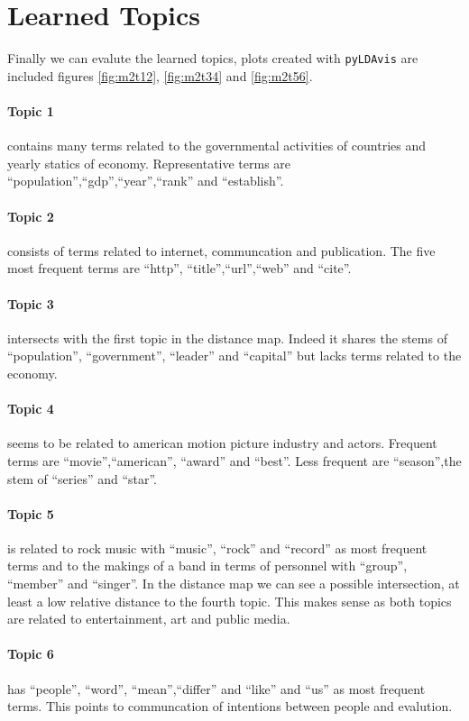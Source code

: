 \documentclass[12 pt,twopage]{article}
\begin{document}
\section{Learned Topics}
Finally we can evalute the learned topics, plots created with \texttt{pyLDAvis} are included figures \ref{fig:m2t12}, \ref{fig:m2t34} and \ref{fig:m2t56}.
\paragraph{Topic 1} contains many terms related to the governmental activities of countries and yearly statics of economy. Representative terms are \enquote{population},\enquote{gdp},\enquote{year},\enquote{rank} and \enquote{establish}.
\paragraph{Topic 2}  consists of terms  related to internet, communcation and publication. The five most frequent terms are \enquote{http}, \enquote{title},\enquote{url},\enquote{web} and \enquote{cite}.
\paragraph{Topic 3} intersects with the first topic in the distance map. Indeed it shares the stems of \enquote{population}, \enquote{government}, \enquote{leader} and \enquote{capital} but lacks terms related to the economy.

\paragraph{Topic 4} seems to be related to american motion picture industry and actors. Frequent terms are \enquote{movie},\enquote{american}, \enquote{award} and \enquote{best}. Less frequent are \enquote{season},the stem of \enquote{series} and \enquote{star}.
\paragraph{Topic 5} is related to rock music with \enquote{music}, \enquote{rock} and \enquote{record} as most frequent terms and to the makings of a band in terms of personnel with \enquote{group}, \enquote{member} and \enquote{singer}.
In the distance map we can see a possible intersection, at least a low relative distance to the fourth topic. This makes sense as both topics are related to entertainment, art and public media.

\paragraph{Topic 6} has \enquote{people}, \enquote{word}, \enquote{mean},\enquote{differ} and \enquote{like} and \enquote{us} as most frequent terms. This points to communcation of intentions between people and evalution.
\end{document}
